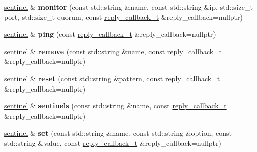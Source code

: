 \begin{DoxyCompactItemize}
\mbox{\hyperlink{classcpp__redis_1_1sentinel}{sentinel}} \& {\bfseries monitor} (const std\+::string \&name, const std\+::string \&ip, std\+::size\+\_\+t port, std\+::size\+\_\+t quorum, const \mbox{\hyperlink{classcpp__redis_1_1sentinel_ae1a150ff8787208c47414397a061c9a7}{reply\+\_\+callback\+\_\+t}} \&reply\+\_\+callback=nullptr)
\item 
\mbox{\label{classcpp__redis_1_1sentinel_aba0190b2773d4d1f8d5e4c5aac22ce19}} 
\mbox{\hyperlink{classcpp__redis_1_1sentinel}{sentinel}} \& {\bfseries ping} (const \mbox{\hyperlink{classcpp__redis_1_1sentinel_ae1a150ff8787208c47414397a061c9a7}{reply\+\_\+callback\+\_\+t}} \&reply\+\_\+callback=nullptr)
\item 
\mbox{\label{classcpp__redis_1_1sentinel_aee344f7f63bc02d13cb9dce08d48d5d9}} 
\mbox{\hyperlink{classcpp__redis_1_1sentinel}{sentinel}} \& {\bfseries remove} (const std\+::string \&name, const \mbox{\hyperlink{classcpp__redis_1_1sentinel_ae1a150ff8787208c47414397a061c9a7}{reply\+\_\+callback\+\_\+t}} \&reply\+\_\+callback=nullptr)
\item 
\mbox{\label{classcpp__redis_1_1sentinel_a11d5f170474aa881df3b6f3cbbde3569}} 
\mbox{\hyperlink{classcpp__redis_1_1sentinel}{sentinel}} \& {\bfseries reset} (const std\+::string \&pattern, const \mbox{\hyperlink{classcpp__redis_1_1sentinel_ae1a150ff8787208c47414397a061c9a7}{reply\+\_\+callback\+\_\+t}} \&reply\+\_\+callback=nullptr)
\item 
\mbox{\label{classcpp__redis_1_1sentinel_a38436712626f27867ecff225eed87a7f}} 
\mbox{\hyperlink{classcpp__redis_1_1sentinel}{sentinel}} \& {\bfseries sentinels} (const std\+::string \&name, const \mbox{\hyperlink{classcpp__redis_1_1sentinel_ae1a150ff8787208c47414397a061c9a7}{reply\+\_\+callback\+\_\+t}} \&reply\+\_\+callback=nullptr)
\item 
\mbox{\label{classcpp__redis_1_1sentinel_a1579c9c9b8ac3cded0a7d70e709e5e1b}} 
\mbox{\hyperlink{classcpp__redis_1_1sentinel}{sentinel}} \& {\bfseries set} (const std\+::string \&name, const std\+::string \&option, const std\+::string \&value, const \mbox{\hyperlink{classcpp__redis_1_1sentinel_ae1a150ff8787208c47414397a061c9a7}{reply\+\_\+callback\+\_\+t}} \&reply\+\_\+callback=nullptr)

\end{DoxyCompactItemize}
